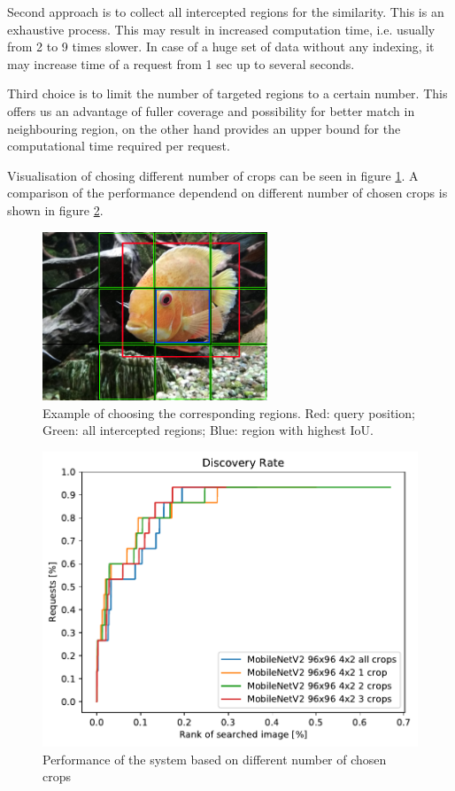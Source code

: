 Second approach is to collect all intercepted regions for the similarity. This is an exhaustive process. This may result in increased computation time, i.e. usually from 2 to 9 times slower. In case of a huge set of data without any indexing, it may increase time of a request from 1 sec up to several seconds.

Third choice is to limit the number of targeted regions to a certain number. This offers us an advantage of fuller coverage and possibility for better match in neighbouring region, on the other hand provides an upper bound for the computational time required per request. 

Visualisation of chosing different number of crops can be seen in figure \ref{fig:fish_with_grid}. A comparison of the performance dependend on different number of chosen crops is shown in figure \ref{fig:crop_limitation}.

\begin{figure}
\centering
\includegraphics[width=0.6\textwidth]{img/fish_grid_regions}
\caption{Example of choosing the corresponding regions. Red: query position; Green: all intercepted regions; Blue: region with highest IoU.}
\label{fig:fish_with_grid}
\end{figure}


\begin{figure}
\centering
\includegraphics[width=\textwidth]{graphs/c2cf4e147040018e6cfc46043bb59de4f5f3e83441c1e1024af0b7bab644a994}
\caption{Performance of the system based on different number of chosen crops}
\label{fig:crop_limitation}
\end{figure}


